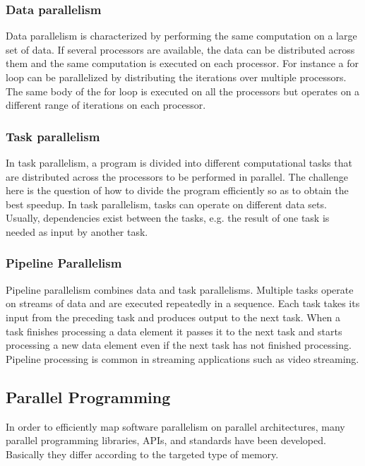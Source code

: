 \subsubsection{Data parallelism}
Data parallelism is characterized by performing the same computation on a large set of data. If several processors are available, the data can be distributed across them and the same computation is executed on each processor. For instance a for loop can be parallelized by distributing the iterations over multiple processors. The same body of the for loop is executed on all the processors but operates on a different range of iterations on each processor.

\subsubsection{Task parallelism}
In task parallelism, a program is divided into different computational tasks that are distributed across the processors to be performed in parallel. The challenge here is the question of how to divide the program efficiently so as to obtain the best speedup. In task parallelism, tasks can operate on different data sets. Usually, dependencies exist between the tasks, e.g. the result of one task is needed as input by another task.

\subsubsection{Pipeline Parallelism}

Pipeline parallelism combines data and task parallelisms. Multiple tasks operate on streams of data and are executed repeatedly in a sequence. Each task takes its input from the preceding task and produces output to the next task. When a task finishes processing a data element it passes it to the next task and starts processing a new data element even if the next task has not finished processing. Pipeline processing is common in streaming applications such as video streaming. 

\subsection{Parallel Programming}

In order to efficiently map software parallelism on parallel architectures, many parallel programming libraries, APIs, and standards have been developed. Basically they differ according to the targeted type of memory.

